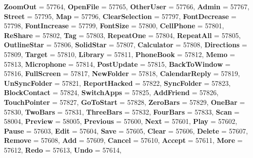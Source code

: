 \begin{DoxyCompactItemize}
{\bfseries Zoom\+Out} = 57764, 
{\bfseries Open\+File} = 57765, 
{\bfseries Other\+User} = 57766, 
\newline
{\bfseries Admin} = 57767, 
{\bfseries Street} = 57795, 
{\bfseries Map} = 57796, 
{\bfseries Clear\+Selection} = 57797, 
\newline
{\bfseries Font\+Decrease} = 57798, 
{\bfseries Font\+Increase} = 57799, 
{\bfseries Font\+Size} = 57800, 
{\bfseries Cell\+Phone} = 57801, 
\newline
{\bfseries Re\+Share} = 57802, 
{\bfseries Tag} = 57803, 
{\bfseries Repeat\+One} = 57804, 
{\bfseries Repeat\+All} = 57805, 
\newline
{\bfseries Outline\+Star} = 57806, 
{\bfseries Solid\+Star} = 57807, 
{\bfseries Calculator} = 57808, 
{\bfseries Directions} = 57809, 
\newline
{\bfseries Target} = 57810, 
{\bfseries Library} = 57811, 
{\bfseries Phone\+Book} = 57812, 
{\bfseries Memo} = 57813, 
\newline
{\bfseries Microphone} = 57814, 
{\bfseries Post\+Update} = 57815, 
{\bfseries Back\+To\+Window} = 57816, 
{\bfseries Full\+Screen} = 57817, 
\newline
{\bfseries New\+Folder} = 57818, 
{\bfseries Calendar\+Reply} = 57819, 
{\bfseries Un\+Sync\+Folder} = 57821, 
{\bfseries Report\+Hacked} = 57822, 
\newline
{\bfseries Sync\+Folder} = 57823, 
{\bfseries Block\+Contact} = 57824, 
{\bfseries Switch\+Apps} = 57825, 
{\bfseries Add\+Friend} = 57826, 
\newline
{\bfseries Touch\+Pointer} = 57827, 
{\bfseries Go\+To\+Start} = 57828, 
{\bfseries Zero\+Bars} = 57829, 
{\bfseries One\+Bar} = 57830, 
\newline
{\bfseries Two\+Bars} = 57831, 
{\bfseries Three\+Bars} = 57832, 
{\bfseries Four\+Bars} = 57833, 
{\bfseries Scan} = 58004, 
\newline
{\bfseries Preview} = 58005, 
{\bfseries Previous} = 57600, 
{\bfseries Next} = 57601, 
{\bfseries Play} = 57602, 
\newline
{\bfseries Pause} = 57603, 
{\bfseries Edit} = 57604, 
{\bfseries Save} = 57605, 
{\bfseries Clear} = 57606, 
\newline
{\bfseries Delete} = 57607, 
{\bfseries Remove} = 57608, 
{\bfseries Add} = 57609, 
{\bfseries Cancel} = 57610, 
\newline
{\bfseries Accept} = 57611, 
{\bfseries More} = 57612, 
{\bfseries Redo} = 57613, 
{\bfseries Undo} = 57614, 
\newline

\end{DoxyCompactItemize}
